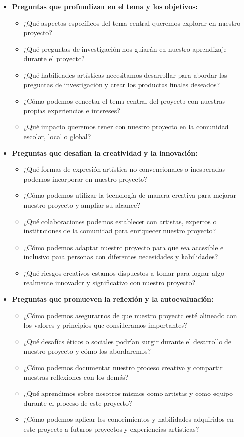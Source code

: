 \begin{itemize}
    \item \textbf{Preguntas que profundizan en el tema y los objetivos:}
    \begin{itemize}
        \item ¿Qué aspectos específicos del tema central queremos explorar en nuestro proyecto?
        \item ¿Qué preguntas de investigación nos guiarán en nuestro aprendizaje durante el proyecto?
        \item ¿Qué habilidades artísticas necesitamos desarrollar para abordar las preguntas de investigación y crear los productos finales deseados?
        \item ¿Cómo podemos conectar el tema central del proyecto con nuestras propias experiencias e intereses?
        \item ¿Qué impacto queremos tener con nuestro proyecto en la comunidad escolar, local o global?
    \end{itemize}
    \item \textbf{Preguntas que desafían la creatividad y la innovación:}
    \begin{itemize}
        \item ¿Qué formas de expresión artística no convencionales o inesperadas podemos incorporar en nuestro proyecto?
        \item ¿Cómo podemos utilizar la tecnología de manera creativa para mejorar nuestro proyecto y ampliar su alcance?
        \item ¿Qué colaboraciones podemos establecer con artistas, expertos o instituciones de la comunidad para enriquecer nuestro proyecto?
        \item ¿Cómo podemos adaptar nuestro proyecto para que sea accesible e inclusivo para personas con diferentes necesidades y habilidades?
        \item ¿Qué riesgos creativos estamos dispuestos a tomar para lograr algo realmente innovador y significativo con nuestro proyecto?
    \end{itemize}
    \item \textbf{Preguntas que promueven la reflexión y la autoevaluación:}
    \begin{itemize}
        \item ¿Cómo podemos asegurarnos de que nuestro proyecto esté alineado con los valores y principios que consideramos importantes?
        \item ¿Qué desafíos éticos o sociales podrían surgir durante el desarrollo de nuestro proyecto y cómo los abordaremos?
        \item ¿Cómo podemos documentar nuestro proceso creativo y compartir nuestras reflexiones con los demás?
        \item ¿Qué aprendimos sobre nosotros mismos como artistas y como equipo durante el proceso de este proyecto?
        \item ¿Cómo podemos aplicar los conocimientos y habilidades adquiridos en este proyecto a futuros proyectos y experiencias artísticas?
    \end{itemize}
\end{itemize}

